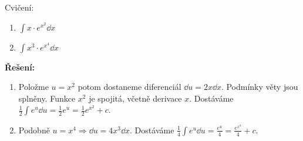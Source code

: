 \begin{mdframed}[style=mdexam]
  \begin{example}\label{MAI:exam119}
    Cvičení:
    \begin{enumerate}[label=\alph*)]
      \item \(\int x\cdot e^{x^2}\dd{x}\)
      \item \(\int x^3\cdot e^{x^4}\dd{x}\)
    \end{enumerate}

    \noindent\textbf{Řešení:}

    \begin{enumerate}[label=\alph*)]
      \item Položme \(u=x^2\) potom dostaneme diferenciál \(\dd{u}=2x\dd{x}\). Podmínky věty jsou
            splněny. Funkce \(x^2\) je spojitá, včetně derivace \(x\). Dostáváme
            \(\frac{1}{2}\int{e^u\dd{u}}=\frac{1}{2}e^u=\frac{1}{2}e^{x^2} + c\). 
      \item Podobně \(u=x^4 \Rightarrow \dd{u}=4x^3\dd{x}\). Dostáváme 
            \(\frac{1}{4}\int{e^u}\dd{u} = \frac{e^u}{4} = \frac{e^{x^4}}{4} + c \).
    \end{enumerate}
  \end{example}
\end{mdframed}